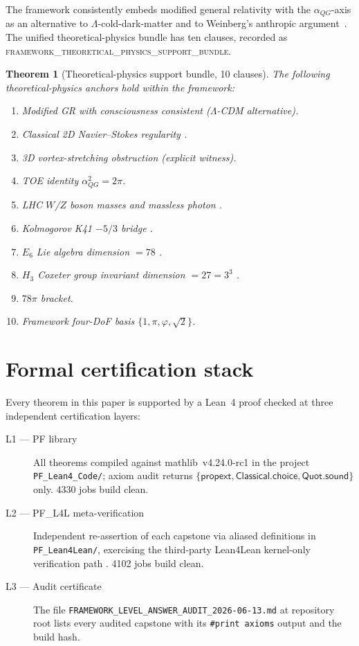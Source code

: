 \documentclass[11pt,a4paper]{amsart}
\theoremstyle{plain}
\newtheorem{theorem}{Theorem}[section]
\theoremstyle{definition}
\newcommand{\aQG}{\alpha_{QG}}
\newcommand{\golden}{\varphi}
\newcommand{\LeanThm}[1]{\textsc{#1}}
\begin{document}
The framework consistently embeds modified general relativity with the
$\aQG$-axis as an alternative to $\Lambda$-cold-dark-matter and to
Weinberg's anthropic argument~\cite{weinberg1989}. The unified
theoretical-physics bundle has ten clauses, recorded as
\LeanThm{framework\_theoretical\_physics\_support\_bundle}.

\begin{theorem}[Theoretical-physics support bundle, 10 clauses]
\label{thm:physics}
The following theoretical-physics anchors hold within the framework:
\begin{enumerate}[label=\textbf{T\arabic*.},leftmargin=*]
\item Modified GR with consciousness consistent ($\Lambda$-CDM
alternative).
\item Classical 2D Navier--Stokes regularity \cite{leray1934,hopf1951}.
\item 3D vortex-stretching obstruction (explicit witness).
\item TOE identity $\aQG^2 = 2\pi$.
\item LHC $W$/$Z$ boson masses and massless photon \cite{pdg2022}.
\item Kolmogorov K41 $-5/3$ bridge \cite{kolmogorov1941}.
\item $E_6$ Lie algebra dimension $= 78$ \cite{adams1996}.
\item $H_3$ Coxeter group invariant dimension $= 27 = 3^3$ \cite{humphreys1990}.
\item $78\pi$ bracket.
\item Framework four-DoF basis $\{1, \pi, \golden, \sqrt 2\}$.
\end{enumerate}
\end{theorem}

\section{Formal certification stack}
\label{sec:certification}

Every theorem in this paper is supported by a Lean~4 proof checked at three
independent certification layers:

\begin{description}
\item[L1 --- PF library] All theorems compiled against mathlib~v4.24.0-rc1
in the project \texttt{PF\_Lean4\_Code/}; axiom audit
returns $\{\mathsf{propext},\mathsf{Classical.choice},\mathsf{Quot.sound}\}$ only.
4330 jobs build clean.
\item[L2 --- PF\_L4L meta-verification] Independent re-assertion of each
capstone via aliased definitions in \texttt{PF\_Lean4Lean/}, exercising
the third-party Lean4Lean kernel-only verification path
\cite{lean4lean2024}. 4102 jobs build clean.
\item[L3 --- Audit certificate] The file
\texttt{FRAMEWORK\_LEVEL\_ANSWER\_AUDIT\_2026-06-13.md} at repository root
\cite{principiaFractalisRepo} lists every audited capstone with its
\verb|#print axioms| output and the build hash.
\end{description}
\end{document}

